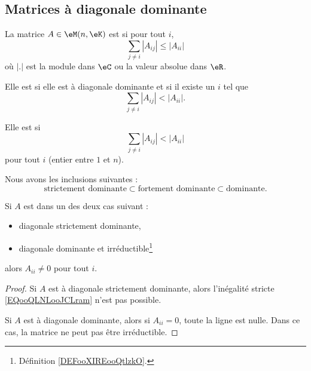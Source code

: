 \subsection{Matrices à diagonale dominante}

\begin{definition}        \label{DEFooLSUTooHuXabV}
    La matrice \( A\in \eM(n,\eK)\) est  si pour tout \( i\),
    \begin{equation}
        \sum_{j\neq i}| A_{ij} |\leq | A_{ii} |
    \end{equation}
    où \( | . |\) est la module dans \( \eC\) ou la valeur absolue dans \( \eR\). 

    Elle est  si elle est à diagonale dominante et si il existe un \( i\) tel que
    \begin{equation}
        \sum_{j\neq i}| A_{ij} |< | A_{ii} |.
    \end{equation}

    Elle est  si 
    \begin{equation}        \label{EQooQLNLooJCLram}
        \sum_{j\neq i}| A_{ij} |< | A_{ii} |
    \end{equation}
    pour tout \( i\) (entier entre \( 1\) et \( n\)).
\end{definition}

Nous avons les inclusions suivantes :
\begin{equation}
    \text{strictement dominante}\subset\text{fortement dominante}\subset\text{dominante}.
\end{equation}

\begin{lemma}       \label{LEMooMQAEooUCkQxU}
    Si \( A\) est dans un des deux cas suivant :
    \begin{itemize}
        \item diagonale strictement dominante,
        \item diagonale dominante et irréductible\footnote{Définition \ref{DEFooXIREooQtlzkO}.}
    \end{itemize}
    alors \( A_{ii}\neq 0\) pour tout \( i\).
\end{lemma}

\begin{proof}
    Si \( A\) est à diagonale strictement dominante, alors l'inégalité stricte \eqref{EQooQLNLooJCLram} n'est pas possible.

    Si \( A\) est à diagonale dominante, alors si \( A_{ii}=0\), toute la ligne est nulle. Dans ce cas, la matrice ne peut pas être irréductible.
\end{proof}

